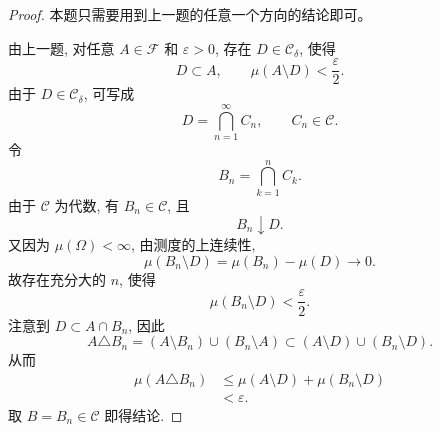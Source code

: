         \begin{proof}
            本题只需要用到上一题的任意一个方向的结论即可。
            
            由上一题, 
            对任意 $A\in\mathcal{F}$ 和 $\varepsilon>0$, 
            存在 $D\in\mathcal{C}_\delta$, 使得
            \[
                D\subset A,\qquad
                \mu(A\setminus D)<\frac{\varepsilon}{2}.
            \]
            由于 $D\in\mathcal{C}_\delta$, 可写成
            \[
                D=\bigcap_{n=1}^\infty C_n,\qquad C_n\in\mathcal{C}.
            \]
            令
            \[
                B_n=\bigcap_{k=1}^n C_k.
            \]
            由于 $\mathcal{C}$ 为代数, 有 $B_n\in\mathcal{C}$, 且
            \[
                B_n\downarrow D.
            \]
            又因为 $\mu(\Omega)<\infty$, 由测度的上连续性,
            \[
                \mu(B_n\setminus D)
                =\mu(B_n)-\mu(D)\to0.
            \]
            故存在充分大的 $n$, 使得
            \[
                \mu(B_n\setminus D)<\frac{\varepsilon}{2}.
            \]
            注意到 $D\subset A\cap B_n$, 因此
            \[
                A\triangle B_n=(A\setminus B_n)\cup(B_n\setminus A)
                \subset
                (A\setminus D)\cup(B_n\setminus D).
            \]
            从而
            \[
            \begin{aligned}
                \mu(A\triangle B_n)
                &\leqslant
                \mu(A\setminus D)+\mu(B_n\setminus D)\\
                &<\varepsilon.
            \end{aligned}
            \]
            取 $B=B_n\in\mathcal{C}$ 即得结论.
        \end{proof}
